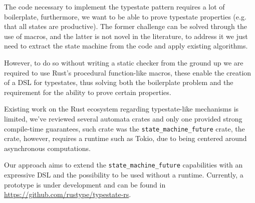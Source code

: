 \documentclass{article}
\begin{document}
The code necessary to implement the typestate pattern requires a lot of boilerplate,
furthermore, we want to be able to prove typestate properties (e.g. that all states are productive).
The former challenge can be solved through the use of macros,
and the latter is not novel in the literature,
to address it we just need to extract the state machine from the code and apply existing algorithms.

However, to do so without writing a static checker from the ground up we are required to use Rust's procedural function-like macros,
these enable the creation of a DSL for typestates,
thus solving both the boilerplate problem and the requirement for the ability to prove certain properties.

Existing work on the Rust ecosystem regarding typestate-like mechanisms is limited,
we've reviewed several automata crates and only one provided strong compile-time guarantees,
such crate was the \texttt{state\_machine\_future} crate, the crate, however, requires a runtime such as Tokio, due to being centered around asynchronous computations.

Our approach aims to extend the \texttt{state\_machine\_future} capabilities with an expressive DSL and
the possibility to be used without a runtime.
Currently, a prototype is under development and can be found in \url{https://github.com/rustype/typestate-rs}.

\end{document}
